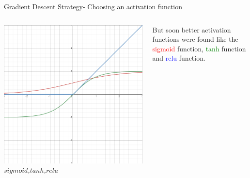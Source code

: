 \begin{frame}{Gradient Descent Strategy- Choosing an activation function}
	\begin{columns}[T]
        \begin{column}{0.5\textwidth}
        	\includegraphics[width=\textwidth]{images/relu.png}
        	\tiny{\textit{$sigmoid$,$tanh$,$relu$}}
        \end{column}
	    \begin{column}{0.5\textwidth}
    	    But soon better activation functions were found like the \textcolor{red}{sigmoid} function, \textcolor{green}{tanh} function and \textcolor{blue}{relu} function.
    	\end{column}
    \end{columns}
\end{frame}

